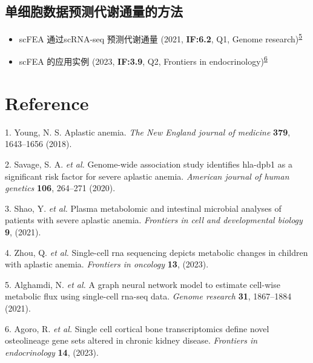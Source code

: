 \documentclass[
]{article}
\providecommand{\tightlist}{%
  \setlength{\itemsep}{0pt}\setlength{\parskip}{0pt}}
\newenvironment{cslreferences}%
  {}%
  {\par}
\begin{document}
\begin{center}\vspace{1.5cm}\end{center}

\hypertarget{ux5355ux7ec6ux80deux6570ux636eux9884ux6d4bux4ee3ux8c22ux901aux91cfux7684ux65b9ux6cd5}{%
\subsection{单细胞数据预测代谢通量的方法}\label{ux5355ux7ec6ux80deux6570ux636eux9884ux6d4bux4ee3ux8c22ux901aux91cfux7684ux65b9ux6cd5}}

\begin{itemize}
\tightlist
\item
  scFEA 通过scRNA-seq 预测代谢通量 (2021, \textbf{IF:6.2}, Q1, Genome research)\textsuperscript{\protect\hyperlink{ref-AGraphNeuralAlgham2021}{5}}
\item
  scFEA 的应用实例 (2023, \textbf{IF:3.9}, Q2, Frontiers in endocrinology)\textsuperscript{\protect\hyperlink{ref-SingleCellCorAgoro2023}{6}}
\end{itemize}

\hypertarget{bibliography}{%
\section*{Reference}\label{bibliography}}

\hypertarget{refs}{}
\begin{cslreferences}
\leavevmode\hypertarget{ref-Aplastic_Anemia_Young_2018}{}%
1. Young, N. S. Aplastic anemia. \emph{The New England journal of medicine} \textbf{379}, 1643--1656 (2018).

\leavevmode\hypertarget{ref-Genome_wide_Ass_Savage_2020}{}%
2. Savage, S. A. \emph{et al.} Genome-wide association study identifies hla-dpb1 as a significant risk factor for severe aplastic anemia. \emph{American journal of human genetics} \textbf{106}, 264--271 (2020).

\leavevmode\hypertarget{ref-Plasma_Metabolo_Shao_2021}{}%
3. Shao, Y. \emph{et al.} Plasma metabolomic and intestinal microbial analyses of patients with severe aplastic anemia. \emph{Frontiers in cell and developmental biology} \textbf{9}, (2021).

\leavevmode\hypertarget{ref-Single_cell_RNA_Zhou_2023}{}%
4. Zhou, Q. \emph{et al.} Single-cell rna sequencing depicts metabolic changes in children with aplastic anemia. \emph{Frontiers in oncology} \textbf{13}, (2023).

\leavevmode\hypertarget{ref-AGraphNeuralAlgham2021}{}%
5. Alghamdi, N. \emph{et al.} A graph neural network model to estimate cell-wise metabolic flux using single-cell rna-seq data. \emph{Genome research} \textbf{31}, 1867--1884 (2021).

\leavevmode\hypertarget{ref-SingleCellCorAgoro2023}{}%
6. Agoro, R. \emph{et al.} Single cell cortical bone transcriptomics define novel osteolineage gene sets altered in chronic kidney disease. \emph{Frontiers in endocrinology} \textbf{14}, (2023).
\end{cslreferences}
\end{document}
